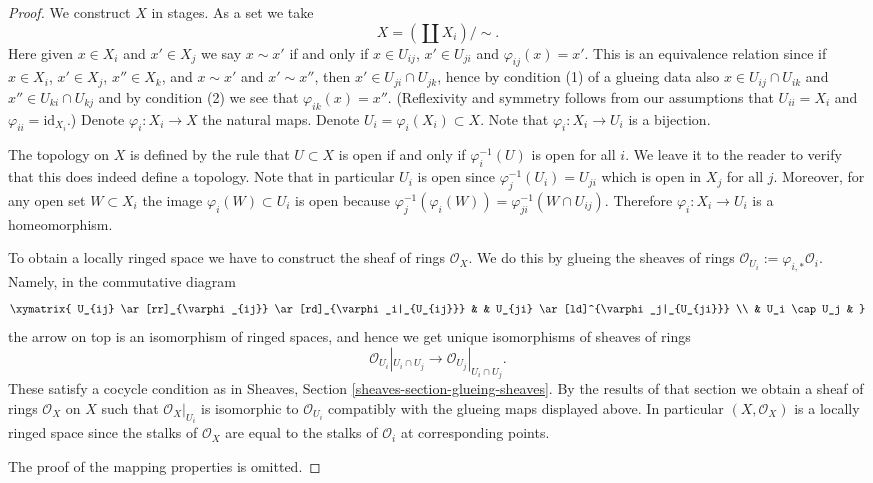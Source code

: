 \begin{proof}
We construct $X$ in stages.
As a set we take
$$
X = (\coprod X_i) / \sim.
$$
Here given $x \in X_i$ and $x' \in X_j$ we say
$x \sim x'$ if and only if $x \in U_{ij}$, $x' \in U_{ji}$
and $\varphi_{ij}(x) = x'$. This is an equivalence relation
since if $x \in X_i$, $x' \in X_j$, $x'' \in X_k$, and $x \sim x'$ and
$x' \sim x''$, then $x' \in U_{ji} \cap U_{jk}$, hence by condition (1) of
a glueing data also $x \in U_{ij} \cap U_{ik}$ and
$x'' \in U_{ki} \cap U_{kj}$ and by condition (2)
we see that $\varphi_{ik}(x) = x''$. (Reflexivity and symmetry
follows from our assumptions that $U_{ii} = X_i$ and
$\varphi_{ii} = \text{id}_{X_i}$.)
Denote $\varphi_i : X_i \to X$
the natural maps. Denote $U_i = \varphi_i(X_i) \subset X$.
Note that $\varphi_i : X_i \to U_i$ is a bijection.

\medskip\noindent
The topology on $X$ is defined by the rule that
$U \subset X$ is open if and only if $\varphi_i^{-1}(U)$
is open for all $i$. We leave it to the reader to verify
that this does indeed define a topology.
Note that in particular $U_i$ is open since $\varphi_j^{-1}(U_i)
= U_{ji}$ which is open in $X_j$ for all $j$.
Moreover, for any open set $W \subset X_i$ the image
$\varphi_i(W) \subset U_i$ is open because
$\varphi_j^{-1}(\varphi_i(W)) = \varphi_{ji}^{-1}(W \cap U_{ij})$.
Therefore $\varphi_i : X_i \to U_i$ is a homeomorphism.

\medskip\noindent
To obtain a locally ringed space we have to construct the
sheaf of rings $\mathcal{O}_X$. We do this by glueing the
sheaves of rings $\mathcal{O}_{U_i} := \varphi_{i, *} \mathcal{O}_i$.
Namely, in the commutative diagram
$$
\xymatrix{
U_{ij} \ar[rr]_{\varphi_{ij}} \ar[rd]_{\varphi_i|_{U_{ij}}}
& &
U_{ji} \ar[ld]^{\varphi_j|_{U_{ji}}} \\
& U_i \cap U_j &
}
$$
the arrow on top is an isomorphism of ringed spaces,
and hence we get unique isomorphisms of sheaves of rings
$$
\mathcal{O}_{U_i}|_{U_i \cap U_j}
\longrightarrow
\mathcal{O}_{U_j}|_{U_i \cap U_j}.
$$
These satisfy a cocycle condition as in Sheaves,
Section \ref{sheaves-section-glueing-sheaves}.
By the results of that section we obtain a sheaf of rings
$\mathcal{O}_X$ on $X$ such that $\mathcal{O}_X|_{U_i}$
is isomorphic to $\mathcal{O}_{U_i}$ compatibly with
the glueing maps displayed above.
In particular $(X, \mathcal{O}_X)$ is a locally ringed
space since the stalks of $\mathcal{O}_X$ are equal
to the stalks of $\mathcal{O}_i$ at corresponding
points.

\medskip\noindent
The proof of the mapping properties is omitted.
\end{proof}

